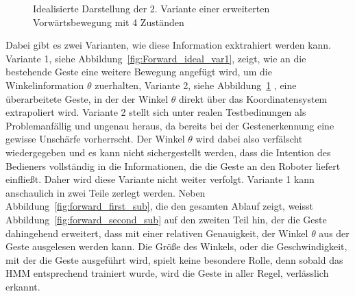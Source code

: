 \begin{figure}[htb]
\centering
{}
\caption[Idealisierte Darstellung der 2. Variante einer erweiterten Vorw\"artsbewegung mit 4 Zust\"anden]{Idealisierte Darstellung der 2. Variante einer erweiterten Vorw\"artsbewegung mit 4 Zust\"anden}
\label{fig:Forward_ideal_var2}
\end{figure}

Dabei gibt es zwei Varianten, wie diese Information exktrahiert werden kann. Variante 1, siehe Abbildung~\ref{fig:Forward_ideal_var1}, zeigt, wie an die bestehende Geste eine weitere Bewegung angef\"ugt wird, um die Winkelinformation $\theta$ zuerhalten, Variante 2, siehe Abbildung~\ref{fig:Forward_ideal_var2} , eine \"uberarbeitete Geste, in der der Winkel $\theta$ direkt \"uber das Koordinatensystem extrapoliert wird.
\newline
Variante 2 stellt sich unter realen Testbedinungen als Problemanf\"allig und ungenau heraus, da bereits bei der Gestenerkennung eine gewisse Unsch\"arfe vorherrscht. Der Winkel $\theta$ wird dabei also verf\"alscht wiedergegeben und es kann nicht sichergestellt werden, dass die Intention des Bedieners vollst\"andig in die Informationen, die die Geste an den Roboter liefert einflie\ss t. Daher wird diese Variante nicht weiter verfolgt.
\newline
Variante 1 kann anschaulich in zwei Teile zerlegt werden. Neben Abbildung~\ref{fig:forward_first_sub}, die den gesamten Ablauf zeigt, weisst Abbildung~\ref{fig:forward_second_sub} auf den zweiten Teil hin, der die Geste dahingehend erweitert, dass mit einer relativen Genauigkeit, der Winkel $\theta$ aus der Geste ausgelesen werden kann. Die Gr\"o\ss e des Winkels, oder die Geschwindigkeit, mit der die Geste ausgef\"uhrt wird, spielt keine besondere Rolle, denn sobald das \acrshort{HMM} entsprechend trainiert wurde, wird die Geste in aller Regel, verl\"asslich erkannt.

